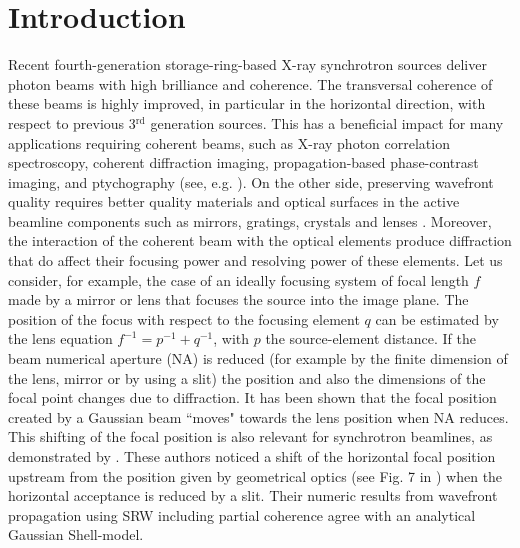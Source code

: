 \documentclass{iucr}              %
\begin{document}
\section{Introduction}
\label{sec:introduction}


Recent fourth-generation storage-ring-based X-ray synchrotron sources deliver photon beams with high brilliance and coherence. The transversal coherence of these beams is highly improved, in particular in the horizontal direction, with respect to previous 3$^{\text{rd}}$ generation sources. This has a beneficial impact for many applications requiring coherent beams, such as X-ray photon correlation spectroscopy, coherent diffraction imaging, propagation-based phase-contrast imaging, and ptychography (see, e.g. \cite{paganin_book}). On the other side, preserving wavefront quality requires better quality materials and optical surfaces in the active beamline components such as mirrors, gratings, crystals and lenses \cite{Yabashi, Roth2017}. Moreover, the interaction of the coherent beam with the optical elements produce diffraction that do affect their focusing power and resolving power of these elements. Let us consider, for example, the case of an ideally focusing system of focal length $f$ made by a mirror or lens that focuses the source into the image plane. The position of the focus with respect to the focusing element $q$ can be estimated by the lens equation $f^{-1}=p^{-1}+q^{-1}$, with $p$ the source-element distance. If the beam numerical aperture (NA) is reduced (for example by the finite dimension of the lens, mirror or by using a slit) the position and also the dimensions of the focal point changes due to diffraction. It has been shown \cite{Tanaka:85} that the focal position created by a Gaussian beam ``moves" towards the lens position when NA reduces. This shifting of the focal position is also relevant for synchrotron beamlines, as demonstrated by . These authors noticed a shift of the horizontal focal position upstream from the position given by geometrical optics (see Fig. 7 in ) when the horizontal acceptance is reduced by a slit. Their numeric results from wavefront propagation using SRW \cite{codeSRW} including partial coherence agree with an analytical Gaussian Shell-model.
\end{document}
